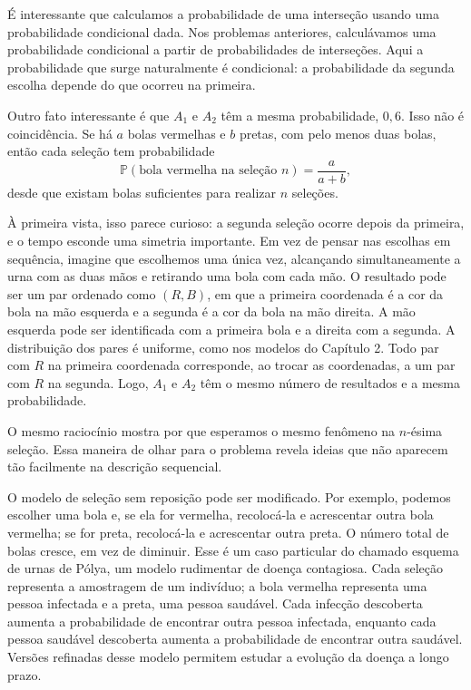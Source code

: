 É interessante que calculamos a probabilidade de uma interseção usando uma probabilidade condicional dada. Nos problemas anteriores, calculávamos uma probabilidade condicional a partir de probabilidades de interseções. Aqui a probabilidade que surge naturalmente é condicional: a probabilidade da segunda escolha depende do que ocorreu na primeira.

Outro fato interessante é que $A_1$ e $A_2$ têm a mesma probabilidade, $0{,}6$. Isso não é coincidência. Se há $a$ bolas vermelhas e $b$ pretas, com pelo menos duas bolas, então cada seleção tem probabilidade
\[
\mathbb{P}(\text{bola vermelha na seleção }n)=\frac{a}{a+b},
\]
desde que existam bolas suficientes para realizar $n$ seleções.

À primeira vista, isso parece curioso: a segunda seleção ocorre depois da primeira, e o tempo esconde uma simetria importante. Em vez de pensar nas escolhas em sequência, imagine que escolhemos uma única vez, alcançando simultaneamente a urna com as duas mãos e retirando uma bola com cada mão. O resultado pode ser um par ordenado como $(R,B)$, em que a primeira coordenada é a cor da bola na mão esquerda e a segunda é a cor da bola na mão direita. A mão esquerda pode ser identificada com a primeira bola e a direita com a segunda. A distribuição dos pares é uniforme, como nos modelos do Capítulo 2. Todo par com $R$ na primeira coordenada corresponde, ao trocar as coordenadas, a um par com $R$ na segunda. Logo, $A_1$ e $A_2$ têm o mesmo número de resultados e a mesma probabilidade.

O mesmo raciocínio mostra por que esperamos o mesmo fenômeno na $n$-ésima seleção. Essa maneira de olhar para o problema revela ideias que não aparecem tão facilmente na descrição sequencial.

O modelo de seleção sem reposição pode ser modificado. Por exemplo, podemos escolher uma bola e, se ela for vermelha, recolocá-la e acrescentar outra bola vermelha; se for preta, recolocá-la e acrescentar outra preta. O número total de bolas cresce, em vez de diminuir. Esse é um caso particular do chamado esquema de urnas de Pólya, um modelo rudimentar de doença contagiosa. Cada seleção representa a amostragem de um indivíduo; a bola vermelha representa uma pessoa infectada e a preta, uma pessoa saudável. Cada infecção descoberta aumenta a probabilidade de encontrar outra pessoa infectada, enquanto cada pessoa saudável descoberta aumenta a probabilidade de encontrar outra saudável. Versões refinadas desse modelo permitem estudar a evolução da doença a longo prazo.

